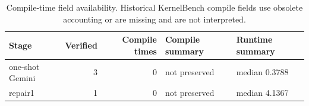 \begin{table}[htbp]
\centering
\caption{Compile-time field availability. Historical KernelBench compile fields use obsolete accounting or are missing and are not interpreted.}
\label{tab:compile-time-summary}
\scriptsize
\begin{tabularx}{\linewidth}{l r r l l}
\toprule
Stage & Verified & Compile times & Compile summary & Runtime summary \\
\midrule
one-shot Gemini & 3 & 0 & not preserved & median 0.3788 \\
repair1 & 1 & 0 & not preserved & median 4.1367 \\
\bottomrule
\end{tabularx}
\end{table}
